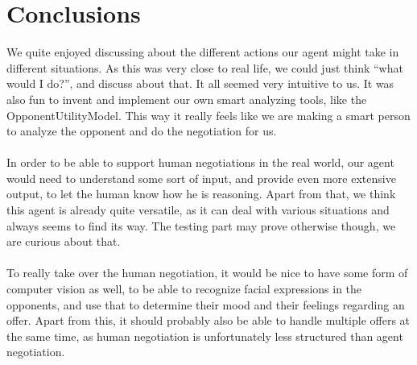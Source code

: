 \section{Conclusions}

We quite enjoyed discussing about the different actions our agent might take in different situations. As this was very close to real life, we could just think ``what would I do?'', and discuss about that. It all seemed very intuitive to us. It was also fun to invent and implement our own smart analyzing tools, like the OpponentUtilityModel. This way it really feels like we are making a smart person to analyze the opponent and do the negotiation for us.
\\\\
In order to be able to support human negotiations in the real world, our agent would need to understand some sort of input, and provide even more extensive output, to let the human know how he is reasoning. Apart from that, we think this agent is already quite versatile, as it can deal with various situations and always seems to find its way. The testing part may prove otherwise though, we are curious about that.
\\\\
To really take over the human negotiation, it would be nice to have some form of computer vision as well, to be able to recognize facial expressions in the opponents, and use that to determine their mood and their feelings regarding an offer. Apart from this, it should probably also be able to handle multiple offers at the same time, as human negotiation is unfortunately less structured than agent negotiation.